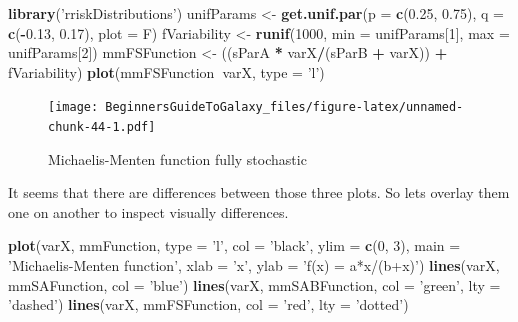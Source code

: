 \documentclass[]{book}
\newenvironment{Shaded}{\begin{snugshade}}{\end{snugshade}}
\newcommand{\KeywordTok}[1]{\textcolor[rgb]{0.13,0.29,0.53}{\textbf{#1}}}
\newcommand{\DataTypeTok}[1]{\textcolor[rgb]{0.13,0.29,0.53}{#1}}
\newcommand{\DecValTok}[1]{\textcolor[rgb]{0.00,0.00,0.81}{#1}}
\newcommand{\FloatTok}[1]{\textcolor[rgb]{0.00,0.00,0.81}{#1}}
\newcommand{\StringTok}[1]{\textcolor[rgb]{0.31,0.60,0.02}{#1}}
\newcommand{\OperatorTok}[1]{\textcolor[rgb]{0.81,0.36,0.00}{\textbf{#1}}}
\newcommand{\NormalTok}[1]{#1}
\theoremstyle{definition}
\theoremstyle{definition}
\theoremstyle{definition}
\theoremstyle{remark}
\begin{document}
\begin{Shaded}
\begin{Highlighting}[]
\KeywordTok{library}\NormalTok{(}\StringTok{'rriskDistributions'}\NormalTok{)}
\NormalTok{unifParams <-}\StringTok{ }\KeywordTok{get.unif.par}\NormalTok{(}\DataTypeTok{p =} \KeywordTok{c}\NormalTok{(}\FloatTok{0.25}\NormalTok{, }\FloatTok{0.75}\NormalTok{), }\DataTypeTok{q =} \KeywordTok{c}\NormalTok{(}\OperatorTok{-}\FloatTok{0.13}\NormalTok{, }\FloatTok{0.17}\NormalTok{), }\DataTypeTok{plot =}\NormalTok{ F)}
\NormalTok{fVariability <-}\StringTok{ }\KeywordTok{runif}\NormalTok{(}\DecValTok{1000}\NormalTok{, }\DataTypeTok{min =}\NormalTok{ unifParams[}\DecValTok{1}\NormalTok{], }\DataTypeTok{max =}\NormalTok{ unifParams[}\DecValTok{2}\NormalTok{])}
\NormalTok{mmFSFunction <-}\StringTok{ }\NormalTok{((sParA }\OperatorTok{*}\StringTok{ }\NormalTok{varX}\OperatorTok{/}\NormalTok{(sParB }\OperatorTok{+}\StringTok{ }\NormalTok{varX)) }\OperatorTok{+}\StringTok{ }\NormalTok{fVariability)}
\KeywordTok{plot}\NormalTok{(mmFSFunction}\OperatorTok{~}\NormalTok{varX, }\DataTypeTok{type =} \StringTok{'l'}\NormalTok{)}
\end{Highlighting}
\end{Shaded}

\begin{figure}
\centering
\texttt{[image: BeginnersGuideToGalaxy\_files/figure-latex/unnamed-chunk-44-1.pdf]}
\caption{\label{fig:unnamed-chunk-44}Michaelis-Menten function fully
stochastic}
\end{figure}

It seems that there are differences between those three plots. So lets
overlay them one on another to inspect visually differences.

\begin{Shaded}
\begin{Highlighting}[]
\KeywordTok{plot}\NormalTok{(varX, mmFunction, }\DataTypeTok{type =} \StringTok{'l'}\NormalTok{,}
     \DataTypeTok{col =} \StringTok{'black'}\NormalTok{, }\DataTypeTok{ylim =} \KeywordTok{c}\NormalTok{(}\DecValTok{0}\NormalTok{, }\DecValTok{3}\NormalTok{),}
     \DataTypeTok{main =} \StringTok{'Michaelis-Menten function'}\NormalTok{, }\DataTypeTok{xlab =} \StringTok{'x'}\NormalTok{, }\DataTypeTok{ylab =} \StringTok{'f(x) = a*x/(b+x)'}\NormalTok{)}
\KeywordTok{lines}\NormalTok{(varX, mmSAFunction, }\DataTypeTok{col =} \StringTok{'blue'}\NormalTok{)}
\KeywordTok{lines}\NormalTok{(varX, mmSABFunction, }\DataTypeTok{col =} \StringTok{'green'}\NormalTok{, }\DataTypeTok{lty =} \StringTok{'dashed'}\NormalTok{)}
\KeywordTok{lines}\NormalTok{(varX, mmFSFunction, }\DataTypeTok{col =} \StringTok{'red'}\NormalTok{, }\DataTypeTok{lty =} \StringTok{'dotted'}\NormalTok{)}
\end{Highlighting}
\end{Shaded}
\end{document}
